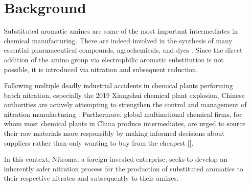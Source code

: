 \section{Background}

Substituted aromatic amines are some of the most important intermediates in chemical manufacturing. There are indeed involved in the synthesis of many essential pharmaceutical compounds, agrochemicals, and dyes \cite{vogt_amines_2000}. Since the direct addition of the amino group via electrophilic aromatic substitution is not possible, it is introduced via nitration and subsequent reduction. 

Following multiple deadly industrial accidents in chemical plants performing batch nitration, especially the 2019 Xiangshui chemical plant explosion, Chinese authorities are actively attempting to strengthen the control and management of nitration manufacturing \cite{el_diario_china_2019}. Furthermore, global multinational chemical firms, for whom most chemical plants in China produce intermediates, are urged to source their raw materials more responsibly by making informed decisions about suppliers rather than only wanting to buy from the cheapest [].

In this context, Nitroma, a foreign-invested enterprise, seeks to develop an inherently safer nitration process for the production of substituted aromatics to their respective nitrates and subsequently to their amines. 





